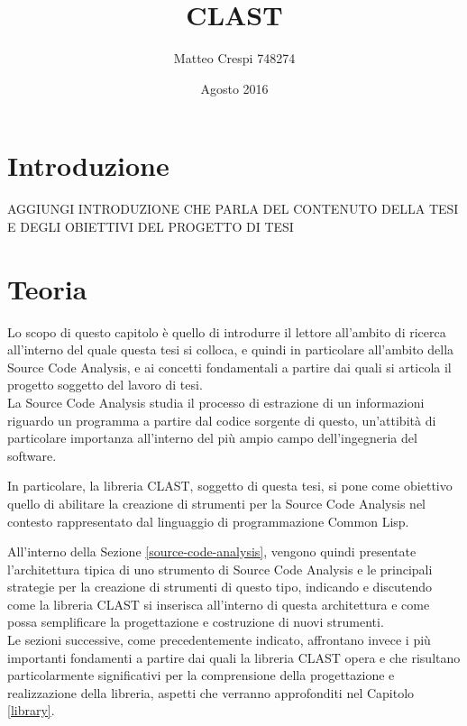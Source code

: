 \documentclass{book}
\title{CLAST}
\author{Matteo Crespi 748274}
\date{Agosto 2016}
\begin{document}
\maketitle

\newpage

\tableofcontents
\listoftables
\listoffigures
\lstlistoflistings

\cleardoublepage

\chapter{Introduzione}

AGGIUNGI INTRODUZIONE CHE PARLA DEL CONTENUTO DELLA TESI E DEGLI OBIETTIVI DEL
PROGETTO DI TESI



\begingroup
\let\clearpage\relax

\chapter{Teoria}

Lo scopo di questo capitolo è quello di introdurre il lettore all'ambito di
ricerca all'interno del quale questa tesi si colloca, e quindi in particolare
all'ambito della Source Code Analysis, e ai concetti fondamentali a partire dai
quali si articola il progetto soggetto del lavoro di tesi.\\

La Source Code Analysis studia il processo di estrazione di un informazioni
riguardo un programma a partire dal codice sorgente di questo, un'attibità di
particolare importanza all'interno del più ampio campo dell'ingegneria del
software.

In particolare, la libreria CLAST, soggetto di questa tesi, si pone come
obiettivo quello di abilitare la creazione di strumenti per la Source Code
Analysis nel contesto rappresentato dal linguaggio di programmazione Common
Lisp.

All'interno della Sezione \ref{source-code-analysis}, vengono quindi presentate
l'architettura tipica di uno strumento di Source Code Analysis e le principali
strategie per la creazione di strumenti di questo tipo, indicando e discutendo
come la libreria CLAST si inserisca all'interno di questa architettura e come
possa semplificare la progettazione e costruzione di nuovi strumenti.\\

Le sezioni successive, come precedentemente indicato, affrontano invece i più
importanti fondamenti a partire dai quali la libreria CLAST opera e che
risultano particolarmente significativi per la comprensione della progettazione
e realizzazione della libreria, aspetti che verranno approfonditi nel Capitolo
\ref{library}.
\end{document}
